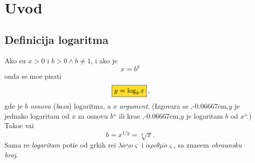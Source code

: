 \documentclass[12pt, twoside, a4paper]{article}
\def\navod#1{\relax,\kern-0.06667em,\relax#1\relax``\relax}
\begin{document}


\tableofcontents

\def\ram#1{\,\fcolorbox{black}{white}{$\displaystyle{\mathstrut #1}$}\,}
\def\okvir#1{\,\fcolorbox{black}{Goldenrod}{$\displaystyle{\mathstrut #1}$}\,}
\def\sledi{{\quad\Rightarrow\quad}}

\section{Uvod}

\subsection{Definicija logaritma}

Ako su $x>0$ i $b>0\land b\ne1$, i ako je
$$
x=b^y
$$
onda se mo{\zv}e pisati
\begin{equation}
\okvir{y=\log_b x},
\end{equation}
gde je $b$ {\sl osnova\/} ({\sl baza\/}) logaritma, a $x$ {\sl argument}.
(Izgovara se \navod{$y$ je jednako logaritam od $x$ za osnovu $b$}
ili kra{\cc}e \navod{$y$ je logaritam $b$ od $x$}.)
Tako{\dj}e va{\zv}i
$$
b=x^{1/y}=\sqrt[y]x.
$$
Sama re{\cv} {\sl logaritam\/} poti{\cv}e od gr{\cv}kih re{\cv}i $\lambda\acute o\gamma o\varsigma$ i 
$\acute\alpha\rho\iota\theta\mu\acute o\varsigma$, sa zna{\cv}e{\nj}em {\sl obra{\cv}unsku broj}.
\end{document}
